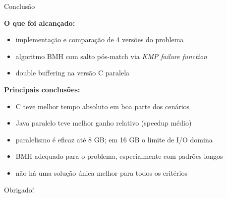 \documentclass{beamer}
\begin{document}
\begin{frame}{Conclusão}

\textbf{O que foi alcançado:}
\begin{itemize}
    \item implementação e comparação de 4 versões do problema
    \item algoritmo BMH com salto pós-match via \textit{KMP failure function}
    \item double buffering na versão C paralela
\end{itemize}

\vspace{0.3cm}

\textbf{Principais conclusões:}
\begin{itemize}
    \item C teve melhor tempo absoluto em boa parte dos cenários
    \item Java paralelo teve melhor ganho relativo (speedup médio)
    \item paralelismo é eficaz até 8 GB; em 16 GB o limite de I/O domina
    \item BMH adequado para o problema, especialmente com padrões longos
    \item não há uma solução única melhor para todos os critérios
\end{itemize}

\vspace{0.3cm}


\end{frame}


\begin{frame}
\centering
\Huge Obrigado!
\end{frame}
\end{document}
